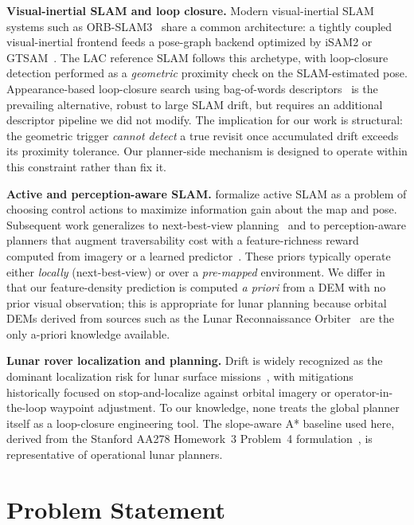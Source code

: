 \documentclass[letterpaper,times]{IONconf}
\begin{document}
\textbf{Visual-inertial SLAM and loop closure.} Modern visual-inertial SLAM systems such as ORB-SLAM3~\citep{campos2021orbslam3} share a common architecture: a tightly coupled visual-inertial frontend feeds a pose-graph backend optimized by iSAM2 or GTSAM~\citep{dellaert2012gtsam}. The LAC reference SLAM follows this archetype, with loop-closure detection performed as a \emph{geometric} proximity check on the SLAM-estimated pose. Appearance-based loop-closure search using bag-of-words descriptors~\citep{galvez2012dbow2} is the prevailing alternative, robust to large SLAM drift, but requires an additional descriptor pipeline we did not modify. The implication for our work is structural: the geometric trigger \emph{cannot detect} a true revisit once accumulated drift exceeds its proximity tolerance. Our planner-side mechanism is designed to operate within this constraint rather than fix it.

\textbf{Active and perception-aware SLAM.} \citet{carrillo2012} formalize active SLAM as a problem of choosing control actions to maximize information gain about the map and pose. Subsequent work generalizes to next-best-view planning~\citep{bircher2016receding} and to perception-aware planners that augment traversability cost with a feature-richness reward computed from imagery or a learned predictor~\citep{costante2018perception, zhang2018perception}. These priors typically operate either \emph{locally} (next-best-view) or over a \emph{pre-mapped} environment. We differ in that our feature-density prediction is computed \emph{a priori} from a DEM with no prior visual observation; this is appropriate for lunar planning because orbital DEMs derived from sources such as the Lunar Reconnaissance Orbiter~\citep{robinson2010lro} are the only a-priori knowledge available.

\textbf{Lunar rover localization and planning.} Drift is widely recognized as the dominant localization risk for lunar surface missions~\citep{petersen2022lunar}, with mitigations historically focused on stop-and-localize against orbital imagery or operator-in-the-loop waypoint adjustment. To our knowledge, none treats the global planner itself as a loop-closure engineering tool. The slope-aware A* baseline used here, derived from the Stanford AA278 Homework~3 Problem~4 formulation~\citep{stanford_aa278_hw3}, is representative of operational lunar planners.


\section{Problem Statement}
\label{sec:problem}
\end{document}
